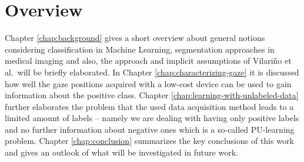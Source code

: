 \section{Overview}
Chapter \ref{chap:background} gives a short overview about general notions considering classification in Machine Learning, segmentation approaches in medical imaging and also, the approach and implicit assumptions of Vilari\~no et al.\ will be briefly elaborated. In Chapter \ref{chap:characterizing-gaze} it is discussed how well the gaze positions acquired with a low-cost device can be used to gain information about the positive class. Chapter \ref{chap:learning-with-unlabeled-data} further elaborates the problem that the used data acquisition method leads to a limited amount of labels -- namely we are dealing with having only positive labels and no further information about negative ones which is a so-called PU-learning problem. 
Chapter \ref{chap:conclusion} summarizes the key conclusions of this work and gives an outlook of what will be investigated in future work.

